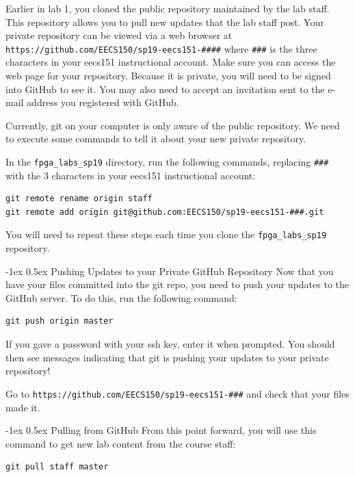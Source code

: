 \documentclass[11pt]{article}
\makeatletter
\renewcommand{\subsection}
{\@startsection {subsection}{1}{0pt}
 {-1ex}
 {0.5ex}
 {\bfseries\normalsize}}
\makeatother
\begin{document}
Earlier in lab 1, you cloned the public repository maintained by the lab staff.  This repository allows you to pull new updates that the lab staff post.  Your private repository can be viewed via a web browser at \verb|https://github.com/EECS150/sp19-eecs151-####| where \verb|###| is the three characters in your eecs151 instructional account.  Make sure you can access the web page for your repository.  Because it is private, you will need to be signed into GitHub to see it.  You may also need to accept an invitation sent to the e-mail address you registered with GitHub.

Currently, git on your computer is only aware of the public repository.  We need to execute some commands to tell it about your new private repository.

In the \verb|fpga_labs_sp19| directory, run the following commands, replacing \verb|###| with the 3 characters in your eecs151 instructional account:
\begin{verbatim}
git remote rename origin staff
git remote add origin git@github.com:EECS150/sp19-eecs151-###.git
\end{verbatim}

You will need to repeat these steps each time you clone the \verb|fpga_labs_sp19| repository.

\subsection{Pushing Updates to your Private GitHub Repository}
Now that you have your files committed into the git repo, you need to push your updates to the GitHub server.  To do this, run the following command:
\begin{verbatim}
git push origin master
\end{verbatim}

If you gave a password with your ssh key, enter it when prompted.  You should then see messages indicating that git is pushing your updates to your private repository!

Go to \verb|https://github.com/EECS150/sp19-eecs151-###| and check that your files made it.

\subsection{Pulling from GitHub}
From this point forward, you will use this command to get new lab content from the course staff:
\begin{verbatim}
git pull staff master
\end{verbatim}
\end{document}
